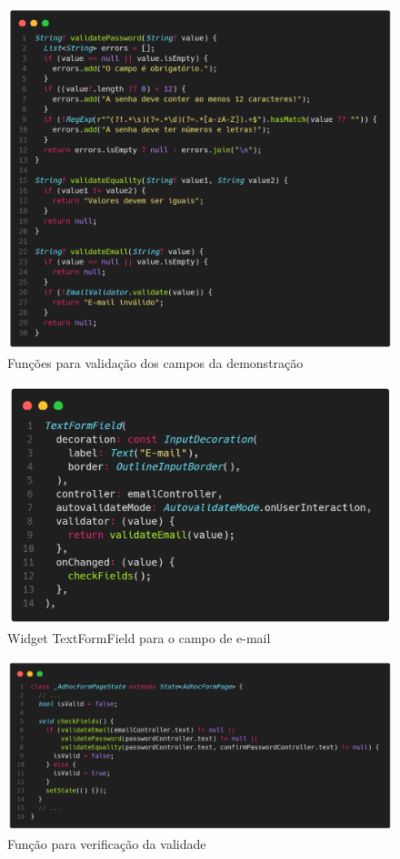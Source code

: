\documentclass[12pt, %
openright, 
oneside, %
a4paper,    %
brazil]{facom-ufu-abntex2}
\begin{document}
\begin{figure}[ht]
    \centering
    \includegraphics[width=.65\textwidth, trim={0 30 0 100}, clip]{figures/forms/form_adhoc_validators.png}
    \caption{Funções para validação dos campos da demonstração}
    \label{fig:form_adhoc_validators}
\end{figure}

\begin{figure}[ht]
    \centering
    \includegraphics[width=.65\textwidth, trim={0 30 0 100}, clip]{figures/forms/form_adhoc_textformfield.png}
    \caption{Widget TextFormField para o campo de e-mail}
    \label{fig:form_adhoc_textformfield}
\end{figure}

\begin{figure}[ht]
    \centering
    \includegraphics[width=.8\textwidth, trim={0 30 0 100}, clip]{figures/forms/form_adhoc_checkFields.png}
    \caption{Função para verificação da validade}
    \label{fig:form_adhoc_checkFields}
\end{figure}
\end{document}

